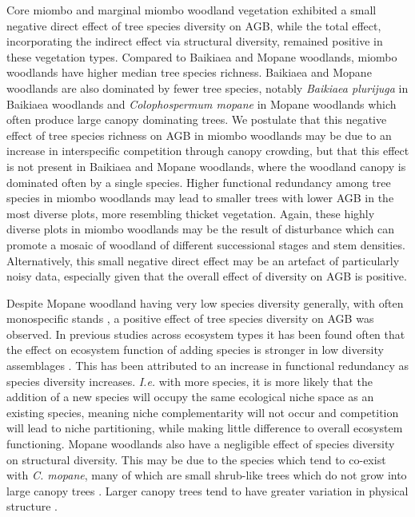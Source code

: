 \documentclass[11pt,a4paper]{article}
\begin{document}
Core miombo and marginal miombo woodland vegetation exhibited a small negative direct effect of tree species diversity on AGB, while the total effect, incorporating the indirect effect via  structural diversity, remained positive in these vegetation types. Compared to Baikiaea and Mopane woodlands, miombo woodlands have higher median tree species richness. Baikiaea and Mopane woodlands are also dominated by fewer tree species, notably \textit{Baikiaea plurijuga} in Baikiaea woodlands and \textit{Colophospermum mopane} in Mopane woodlands which often produce large canopy dominating trees. We postulate that this negative effect of tree species richness on AGB in miombo woodlands may be due to an increase in interspecific competition through canopy crowding, but that this effect is not present in Baikiaea and Mopane woodlands, where the woodland canopy is dominated often by a single species. Higher functional redundancy among tree species in miombo woodlands may lead to smaller trees with lower AGB in the most diverse plots, more resembling thicket vegetation. Again, these highly diverse plots in miombo woodlands may be the result of disturbance which can promote a mosaic of woodland of different successional stages and stem densities. Alternatively, this small negative direct effect may be an artefact of particularly noisy data, especially given that the overall effect of diversity on AGB is positive.

Despite Mopane woodland having very low species diversity generally, with often monospecific stands \citep{Timberlake2010}, a positive effect of tree species diversity on AGB was observed. In previous studies across ecosystem types it has been found often that the effect on ecosystem function of adding species is stronger in low diversity assemblages \citep{Hector2007}. This has been attributed to an increase in functional redundancy as species diversity increases. \textit{I.e.} with more species, it is more likely that the addition of a new species will occupy the same ecological niche space as an existing species, meaning niche complementarity will not occur and competition will lead to niche partitioning, while making little difference to overall ecosystem functioning. Mopane woodlands also have a negligible effect of species diversity on structural diversity. This may be due to the species which tend to co-exist with \textit{C. mopane}, many of which are small shrub-like trees which do not grow into large canopy trees \citep{Timberlake2010}. Larger canopy trees tend to have greater variation in physical structure \citep{Seidel2019}.
\end{document}
